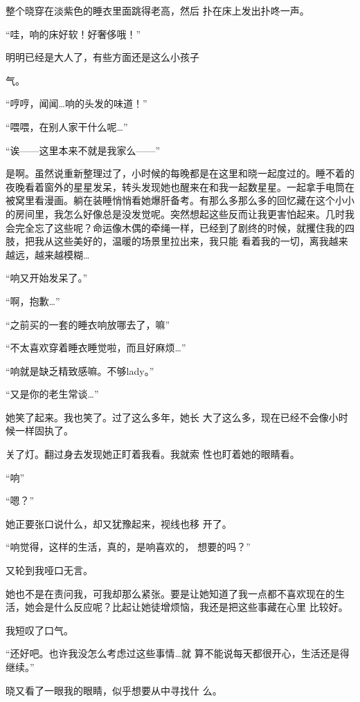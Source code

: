 \documentclass{article}
\begin{document}
整个晓穿在淡紫色的睡衣里面跳得老高，然后
扑在床上发出扑咚一声。 


“哇，响的床好软！好奢侈哦！” 

明明已经是大人了，有些方面还是这么小孩子
\newpage

气。 


“哼哼，闻闻…响的头发的味道！” 


“喂喂，在别人家干什么呢…” 


“诶——这里本来不就是我家么——” 

是啊。虽然说重新整理过了，小时候的每晚都是在这里和晓一起度过的。睡不着的夜晚看着窗外的星星发呆，转头发现她也醒来在和我一起数星星。一起拿手电筒在被窝里看漫画。躺在装睡悄悄看她爆肝备考。有那么多那么多的回忆藏在这个小小的房间里，我怎么好像总是没发觉呢。突然想起这些反而让我更害怕起来。几时我会完全忘了这些呢？命运像木偶的牵绳一样，已经到了剧终的时候，就攫住我的四肢，把我从这些美好的，温暖的场景里拉出来，我只能
看着我的一切，离我越来越远，越来越模糊… 


“响又开始发呆了。” 

\newpage


“啊，抱歉…” 


“之前买的一套的睡衣响放哪去了，嘛” 

“不太喜欢穿着睡衣睡觉啦，而且好麻烦…”
 


“响就是缺乏精致感嘛。不够lady。” 


“又是你的老生常谈…” 

她笑了起来。我也笑了。过了这么多年，她长
大了这么多，现在已经不会像小时候一样固执了。 

关了灯。翻过身去发现她正盯着我看。我就索
性也盯着她的眼睛看。 


“响” 


“嗯？” 

\newpage

她正要张口说什么，却又犹豫起来，视线也移
开了。 

“响觉得，这样的生活，真的，是响喜欢的，
想要的吗？” 


又轮到我哑口无言。 

她也不是在责问我，可我却那么紧张。要是让她知道了我一点都不喜欢现在的生活，她会是什么反应呢？比起让她徒增烦恼，我还是把这些事藏在心里
比较好。 


我短叹了口气。 

“还好吧。也许我没怎么考虑过这些事情…就
算不能说每天都很开心，生活还是得继续。” 

晓又看了一眼我的眼睛，似乎想要从中寻找什
么。 
\end{document}
